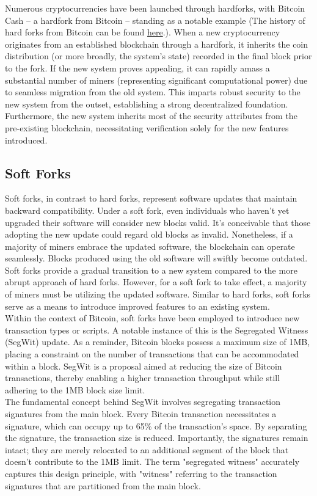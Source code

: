 \documentclass{report}
\begin{document}
Numerous cryptocurrencies have been launched through hardforks, with Bitcoin Cash – a hardfork from Bitcoin – standing as a notable example (The history of hard forks from Bitcoin can be found \href{https://www.investopedia.com/tech/history-bitcoin-hard-forks/}{here}.). When a new cryptocurrency originates from an established blockchain through a hardfork, it inherits the coin distribution (or more broadly, the system's state) recorded in the final block prior to the fork. If the new system proves appealing, it can rapidly amass a substantial number of miners (representing significant computational power) due to seamless migration from the old system. This imparts robust security to the new system from the outset, establishing a strong decentralized foundation. Furthermore, the new system inherits most of the security attributes from the pre-existing blockchain, necessitating verification solely for the new features introduced.
\subsection{Soft Forks}
Soft forks, in contrast to hard forks, represent software updates that maintain backward compatibility. Under a soft fork, even individuals who haven't yet upgraded their software will consider new blocks valid. It's conceivable that those adopting the new update could regard old blocks as invalid. Nonetheless, if a majority of miners embrace the updated software, the blockchain can operate seamlessly. Blocks produced using the old software will swiftly become outdated. Soft forks provide a gradual transition to a new system compared to the more abrupt approach of hard forks. However, for a soft fork to take effect, a majority of miners must be utilizing the updated software. Similar to hard forks, soft forks serve as a means to introduce improved features to an existing system.\\
Within the context of Bitcoin, soft forks have been employed to introduce new transaction types or scripts. A notable instance of this is the Segregated Witness (SegWit) update. As a reminder, Bitcoin blocks possess a maximum size of 1MB, placing a constraint on the number of transactions that can be accommodated within a block. SegWit is a proposal aimed at reducing the size of Bitcoin transactions, thereby enabling a higher transaction throughput while still adhering to the 1MB block size limit.\\
The fundamental concept behind SegWit involves segregating transaction signatures from the main block. Every Bitcoin transaction necessitates a signature, which can occupy up to 65\% of the transaction's space. By separating the signature, the transaction size is reduced. Importantly, the signatures remain intact; they are merely relocated to an additional segment of the block that doesn't contribute to the 1MB limit. The term "segregated witness" accurately captures this design principle, with "witness" referring to the transaction signatures that are partitioned from the main block.
\end{document}
